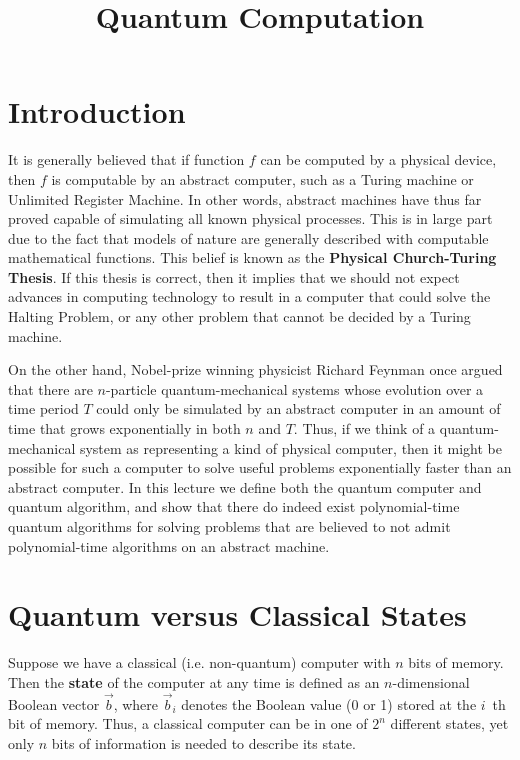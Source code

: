 \documentclass [12pt]{article}
\theoremstyle{definition}
\begin{document}
\title{Quantum Computation}
\author{ }
\date{}
\maketitle

\normalsize

\section*{Introduction}
It is generally believed that if function $f$ can be computed by a physical device, then $f$ is computable by an abstract computer,
such as a Turing machine or Unlimited Register Machine. In other words, abstract machines have thus far proved capable of simulating all known physical processes.
This is in large part due to the fact that models of nature are generally described with computable mathematical functions. This belief is known
as the \textbf{Physical Church-Turing Thesis}. If this thesis is correct, then it implies that we should not expect advances in computing technology 
to result in a computer that could solve the Halting Problem, or any other problem that cannot be decided by a Turing machine.

On the other hand, Nobel-prize winning physicist Richard Feynman once argued that there are $n$-particle quantum-mechanical systems whose evolution over a time period $T$ could only be simulated
by an abstract computer in an amount of time that grows exponentially in both $n$ and $T$. Thus, if we think of a quantum-mechanical system as representing a kind of 
physical computer, then it might be possible for such a computer to solve useful problems exponentially faster than an abstract computer. In this lecture we define both the 
quantum computer and quantum algorithm, and show that there do indeed exist polynomial-time quantum algorithms for solving problems that are believed to not admit 
polynomial-time algorithms on an abstract machine.

\section*{Quantum versus Classical States}

Suppose we have a classical (i.e. non-quantum) computer with $n$ bits of memory. Then the \textbf{state} of the computer at any time is defined as an $n$-dimensional Boolean
vector $\vec{b}$,
where $\vec{b}_i$ denotes the Boolean value (0 or 1) stored at the $i$~th bit of memory. Thus,  a classical computer can be in one of $2^{n}$ different states, yet only
$n$ bits of information is needed to describe its state. 
\end{document}
